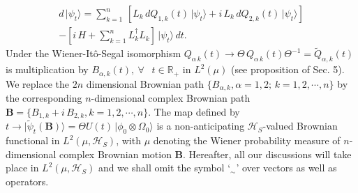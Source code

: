 \begin{multline}
d\,\vert\psi_t\rangle =\sum_{k=1}^{n}\, \left[L_k\,  dQ_{1,k}(t)\, \vert\psi_t\rangle 
+ i\,L_k\,  dQ_{2,k}(t)\, \vert\psi_t\rangle\right]\\  
-\left[i\, H+\sum_{k=1}^{n}L^\dag_k L_k \right] \, \vert\psi_t\rangle\, dt.\label{chap5-eq6.5}
\end{multline}  
Under the Wiener-It{\^o}-Segal isomorphism  $Q_{\alpha\,k}(t)\rightarrow \Theta\, Q_{\alpha\,k}(t)\Theta^{-1}=\widetilde{Q}_{\alpha,k}(t)$ is multiplication by  $B_{\alpha,k}(t),\ \forall \ \ \,\, t\in\mathbb{R}_+$ in  $L^2(\mu)$ (see proposition of Sec. 5). We replace  the $2n$ dimensional Brownian path $\{B_{\alpha,k}, \alpha=1,2;\, k=1,2,\cdots, n\}$  by the corresponding $n$-dimensional complex Brownian path $\mathbf{B}=\{B_{1,k}+i\,B_{2,k},k=1,2,\cdots , n\}.$ The map defined by  $t\rightarrow \vert\widetilde{\psi}_t(\mathbf{B})\rangle= \Theta U(t)\, \vert\phi_0\otimes \Omega_0\rangle$ is a non-anticipating $\mathcal{H}_S$-valued Brownian functional in $L^2(\mu, \mathcal{H}_S)$, with $\mu$ denoting the Wiener probability measure of $n$-dimensional complex Brownian motion $\mathbf{B}$. Hereafter, all our discussions will take place in $L^2(\mu, \mathcal{H}_S)$ and we shall omit the symbol `${}_{\sim}$' over vectors as well as operators.  

